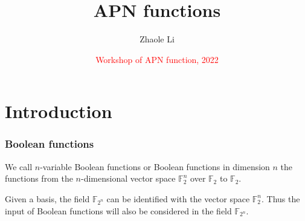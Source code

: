 \documentclass[
    aspectratio=169,                   %
]{beamer}
\newcommand{\F}{\mathbb{F}}
\newcommand{\Fn}{\mathbb{F}_{2^n}}
\begin{document}
    \title{APN functions}  %
    \author{Zhaole Li}                  %
    \date{\textcolor{red}{Workshop of APN function, 2022}}                          %
    \maketitle                             %


\AtBeginSection[]{
    \begin{frame}
        \sectionpage                   %
    \end{frame}
}


\section{Introduction}
    \begin{frame}
        \frametitle{Boolean functions}
    
        We call $ n $-variable Boolean functions or Boolean functions in dimension $ n $ the functions from 
        the $ n $-dimensional vector space $ \F_2^n $ over $ \F_2 $ to $ \F_2 $. 

        Given a basis, the field $ \Fn $ can be identified with the vector space $ \F_2^n $. 
        Thus the input of Boolean functions will also be considered in the field $ \Fn $.

    \end{frame}
\end{document}
